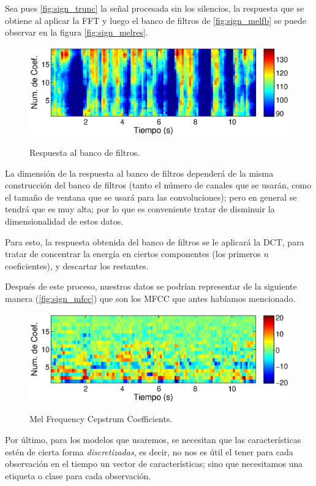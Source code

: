 Sea pues \autoref{fig:sign_trunc} la señal procesada sin los silencios, la respuesta que se obtiene al aplicar la \ac{FFT} y luego el banco de filtros de \autoref{fig:sign_melfb} se puede observar en la figura \autoref{fig:sign_melres}.
\begin{figure}[t]
  \myfloatalign
  {\includegraphics[width=0.9\linewidth]{gfx/chap2/mfcc_result2}} \quad
  \caption{Respuesta al banco de filtros.}
  \label{fig:sign_melres}
\end{figure}

La dimensión de la respuesta al banco de filtros dependerá de la misma construcción del banco de filtros (tanto el número de canales que se usarán, como el tamaño de ventana que se usará para las convoluciones); pero en general se tendrá que es muy alta; por lo que es conveniente tratar de disminuir la dimensionalidad de estos datos.

Para esto, la respuesta obtenida del banco de filtros se le aplicará la \ac{DCT}, para tratar de concentrar la energía en ciertos componentes (los primeros $n$ coeficientes), y descartar los restantes.

Después de este proceso, nuestros datos se podrían representar de la siguiente manera (\autoref{fig:sign_mfcc}) que son los \ac{MFCC} que antes habíamos mencionado.
\begin{figure}[t]
  \myfloatalign
  {\includegraphics[width=0.9\linewidth]{gfx/chap2/mfcc_result3}} \quad
  \caption{Mel Frequency Cepstrum Coefficients.}
  \label{fig:sign_mfcc}
\end{figure}

Por último, para los modelos que usaremos, se necesitan que las características estén de cierta forma \textit{discretizadas}, es decir, no nos es útil el tener para cada observación en el tiempo un vector de características; sino que necesitamos una etiqueta o clase para cada observación. 

